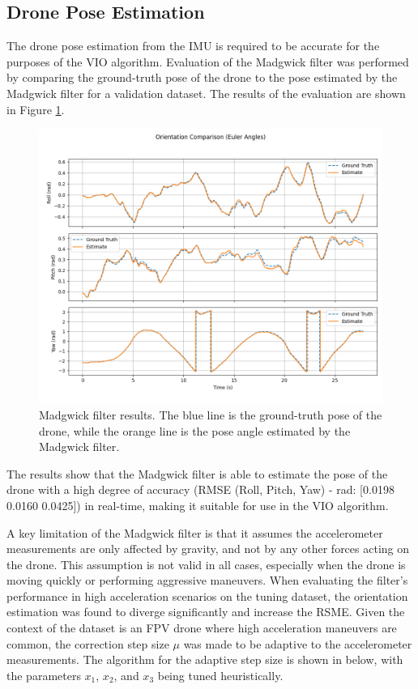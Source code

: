 \documentclass[bare_jrnl_transmag]{subfiles}
\begin{document}
\subsection{Drone Pose Estimation}
The drone pose estimation from the IMU is required to be accurate for the purposes of the VIO algorithm. Evaluation of the Madgwick filter was performed by comparing the ground-truth pose of the drone to the pose estimated by the Madgwick filter for a validation dataset. The results of the evaluation are shown in Figure \ref{fig:madgwick_results}.

\begin{figure}[H]
    \centering
    \includegraphics[width=0.8\linewidth]{figures/madgwick_results.png}
    \caption{Madgwick filter results. The blue line is the ground-truth pose of the drone, while the orange line is the pose angle estimated by the Madgwick filter.}
    \label{fig:madgwick_results}
\end{figure}

The results show that the Madgwick filter is able to estimate the pose of the drone with a high degree of accuracy (RMSE (Roll, Pitch, Yaw) - rad: [0.0198 0.0160 0.0425]) in real-time, making it suitable for use in the VIO algorithm.

A key limitation of the Madgwick filter is that it assumes the accelerometer measurements are only affected by gravity, and not by any other forces acting on the drone. This assumption is not valid in all cases, especially when the drone is moving quickly or performing aggressive maneuvers. When evaluating the filter's performance in high acceleration scenarios on the tuning dataset, the orientation estimation was found to diverge significantly and increase the RSME. Given the context of the dataset is an FPV drone where high acceleration maneuvers are common, the correction step size $\mu$ was made to be adaptive to the accelerometer measurements. The algorithm for the adaptive step size is shown in below, with the parameters $x_1$, $x_2$, and $x_3$ being tuned heuristically.
\end{document}
